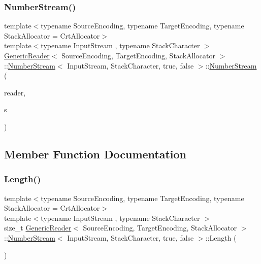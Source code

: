 \subsubsection{\texorpdfstring{Number\+Stream()}{NumberStream()}}
{\footnotesize\ttfamily template$<$typename Source\+Encoding, typename Target\+Encoding, typename Stack\+Allocator = Crt\+Allocator$>$ \\
template$<$typename Input\+Stream , typename Stack\+Character $>$ \\
\hyperlink{classGenericReader}{Generic\+Reader}$<$ Source\+Encoding, Target\+Encoding, Stack\+Allocator $>$\+::\hyperlink{classGenericReader_1_1NumberStream}{Number\+Stream}$<$ Input\+Stream, Stack\+Character, true, false $>$\+::\hyperlink{classGenericReader_1_1NumberStream}{Number\+Stream} (\begin{DoxyParamCaption}\item[{\hyperlink{classGenericReader}{Generic\+Reader} \&}]{reader,  }\item[{Input\+Stream \&}]{s }\end{DoxyParamCaption})\hspace{0.3cm}{\ttfamily [inline]}}



\subsection{Member Function Documentation}
\mbox{\label{classGenericReader_1_1NumberStream_3_01InputStream_00_01StackCharacter_00_01true_00_01false_01_4_a881b01ff74eda61822c999522610a7bd}} 
\subsubsection{\texorpdfstring{Length()}{Length()}}
{\footnotesize\ttfamily template$<$typename Source\+Encoding, typename Target\+Encoding, typename Stack\+Allocator = Crt\+Allocator$>$ \\
template$<$typename Input\+Stream , typename Stack\+Character $>$ \\
size\+\_\+t \hyperlink{classGenericReader}{Generic\+Reader}$<$ Source\+Encoding, Target\+Encoding, Stack\+Allocator $>$\+::\hyperlink{classGenericReader_1_1NumberStream}{Number\+Stream}$<$ Input\+Stream, Stack\+Character, true, false $>$\+::Length (\begin{DoxyParamCaption}{ }\end{DoxyParamCaption})\hspace{0.3cm}{\ttfamily [inline]}}

